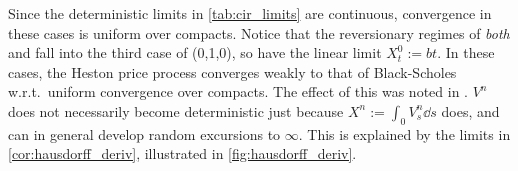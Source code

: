 Since the deterministic limits in \autoref{tab:cir_limits} are continuous, convergence in these cases is uniform over compacts. Notice that the reversionary regimes of \emph{both} \cite{heston_1993} and \cite{fouque_2011} fall into the third case of (0,1,0), so have the linear limit $X^0_t:=bt$. In these cases, the Heston price process converges weakly to that of Black-Scholes w.r.t.~uniform convergence over compacts. The effect of this was noted in \cite{fouque_2011}. $V^n$ does not necessarily become deterministic just because  $X^n:=\int_0 V^n_s\dd s$ does, and can in general develop random excursions to $\infty$. This is explained by the limits in \autoref{cor:hausdorff_deriv}, illustrated in \autoref{fig:hausdorff_deriv}.
